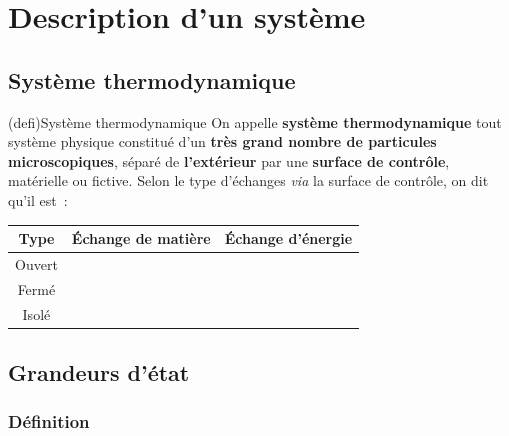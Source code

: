 \documentclass[../../main/main.tex]{subfiles}
\begin{document}

\section{Description d'un système}
\subsection{Système thermodynamique}

\begin{tcb*}(defi){Système thermodynamique}
	On appelle \textbf{système thermodynamique} tout système physique constitué
	d'un \textbf{très grand nombre de particules microscopiques}, séparé de
	\textbf{l'extérieur} par une \textbf{surface de contrôle}, matérielle ou
	fictive. Selon le type d'échanges \textit{via} la surface de contrôle, on dit
	qu'il est~:
	\begin{center}
		\begin{tabular}{ccc}
			\toprule
			\textbf{Type} & \textbf{Échange de matière} & \textbf{Échange d'énergie}
			\\
			\midrule
			Ouvert        & \psw{\cmark}                & \psw{\cmark}
			\\
			Fermé         & \psw{\xmark}                & \psw{\cmark}
			\\
			Isolé         & \psw{\xmark}                & \psw{\xmark}
			\\
			\bottomrule
		\end{tabular}
	\end{center}
\end{tcb*}

\subsection{Grandeurs d'état}
\subsubsection{Définition}
\end{document}
